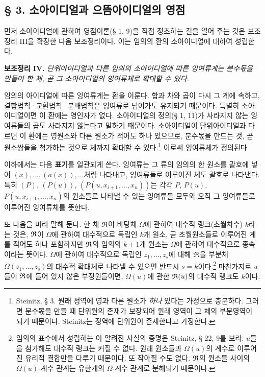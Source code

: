 \subsection*{§ 3. 소아이디얼과 으뜸아이디얼의 영점}

먼저 소아이디얼에 관하여 영점이론(§ 1, 9)을 직접 정초하는 길을 열어 주는 것은 보조정리 III을 확장한 다음 보조정리이다. 이는 임의의 환의 소아이디얼에 대하여 성립한다.

\textbf{보조정리 IV.} \emph{단위아이디얼과 다른 임의의 소아이디얼에 따른 잉여류계는 분수몫을 만들어 한 체, 곧 그 소아이디얼의 잉여류체로 확대할 수 있다.}

임의의 아이디얼에 따른 잉여류계는 환을 이룬다. 합과 차와 곱이 다시 그 계에 속하고, 결합법칙·교환법칙·분배법칙은 잉여류로 넘어가도 유지되기 때문이다. 특별히 소아이디얼이면 이 환에는 영인자가 없다. 소아이디얼의 정의(§ 1, 11)가 사라지지 않는 잉여류들의 곱도 사라지지 않는다고 말하기 때문이다. 소아이디얼이 단위아이디얼과 다르면 이 환에는 영원소와 다른 원소가 적어도 하나 있으므로, 분수몫을 만드는 것, 곧 원소쌍들을 첨가하는 것으로 체까지 확대할 수 있다.\footnote{Steinitz, § 3. 원래 정역에 영과 다른 원소가 \emph{하나} 있다는 가정으로 충분하다. 그러면 분수몫을 만들 때 단위원의 존재가 보장되어 원래 영역이 그 체의 부분영역이 되기 때문이다. Steinitz는 정역에 단위원이 존재한다고 가정한다.} 이로써 잉여류체가 정의된다.

이하에서는 다음 \textbf{표기}를 일관되게 쓴다. 잉여류는 그 류의 임의의 한 원소를 괄호에 넣어 \((x),\ldots,(a(x)),\ldots\)처럼 나타내고, 잉여류들로 이루어진 체도 괄호로 나타낸다. 특히 \((P)\), \((P(u))\), \((P(u,x_{i+1},\ldots,x_n))\)는 각각 \(P\), \(P(u)\), \(P(u,x_{i+1},\ldots,x_n)\)의 원소들로 나타낼 수 있는 잉여류들 모두와 오직 그 잉여류들로 이루어진 잉여류체를 뜻한다.

또 다음을 미리 말해 둔다. 한 체 \(\mathfrak{R}\)이 바탕체 \(\Omega\)에 관하여 대수적 랭크(초월차수) \(k\)라는 것은, \(\mathfrak{R}\)이 \(\Omega\)에 관하여 대수적으로 독립인 \(k\)개 원소, 곧 초월원소들로 이루어진 계를 적어도 하나 포함하지만 \(\mathfrak{R}\)의 임의의 \(k+1\)개 원소는 \(\Omega\)에 관하여 대수적으로 종속이라는 뜻이다. \(\Omega\)에 관하여 대수적으로 독립인 \(z_1,\ldots,z_s\)에 대해 \(\mathfrak{R}\)을 부분체 \(\Omega(z_1,\ldots,z_s)\)의 대수적 확대체로 나타낼 수 있으면 반드시 \(s=k\)이다.\footnote{임의의 표수에서 성립하는 이 알려진 사실의 증명은 Steinitz, § 22, 9를 보라. \(u\)들을 첨가해도 대수적 랭크는 커질 수 없다. 원래 원소들과 \(\Omega(u)\)의 계수로 이루어진 유리적 결합만을 다루기 때문이다. 또 작아질 수도 없다. \(\mathfrak{R}\)의 원소들 사이의 \(\Omega(u)\)-계수 관계는 유한개의 \(\Omega\)-계수 관계로 분해되기 때문이다.} 마찬가지로 \(u\)들이 \(\mathfrak{R}\)에 들어 있지 않은 부정원들이면, \(\Omega(u)\)에 관한 \(\mathfrak{R}(u)\)의 대수적 랭크도 \(k\)이다.

